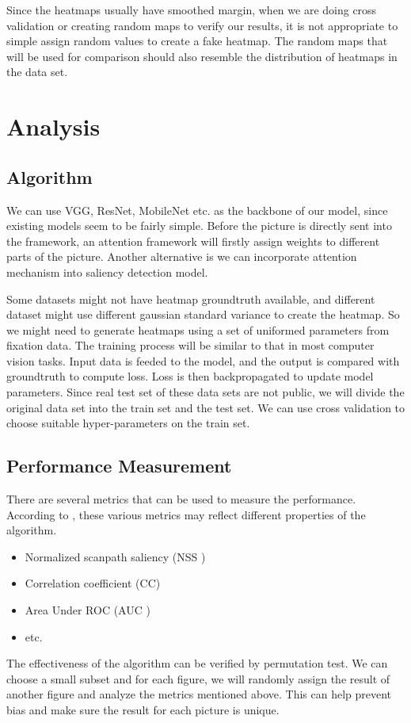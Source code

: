 \documentclass[12pt]{article}
\begin{document}
Since the heatmaps usually have smoothed margin, when we are doing cross validation or creating random maps to verify our results, it is not appropriate to simple assign random values to create a fake heatmap. 
The random maps that will be used for comparison should also resemble the distribution of heatmaps in the data set.

\section{Analysis}
\subsection{Algorithm}

We can use VGG, ResNet, MobileNet etc. as the backbone of our model, since existing models seem to be fairly simple. Before the picture is directly sent into the framework, an attention framework will firstly assign weights to different parts of the picture.
Another alternative is we can incorporate attention mechanism \cite{zhangSelfAttentionGenerativeAdversarial2019a} into saliency detection model.

Some datasets might not have heatmap groundtruth available, and different dataset might use different gaussian standard variance to create the heatmap.
So we might need to generate heatmaps using a set of uniformed parameters from fixation data.
The training process will be similar to that in most computer vision tasks. Input data is feeded to the model,
and the output is compared with groundtruth to compute loss. Loss is then backpropagated to update model parameters.
Since real test set of these data sets are not public, we will divide the original data set into the train set and the test set. We can use cross validation to choose suitable hyper-parameters on the train set.


\subsection{Performance Measurement}

There are several metrics that can be used to measure the performance. According to \cite{riche2013saliency}, these various metrics may reflect different properties of the algorithm.
\begin{itemize}
    \item Normalized scanpath saliency (NSS \cite{petersComponentsBottomupGaze2005})
    \item Correlation coefficient (CC)
    \item Area Under ROC (AUC \cite{richeSaliencyHumanFixations2013})
    \item etc.
\end{itemize}
The effectiveness of the algorithm can be verified by permutation test. We can choose a small subset and for each figure, we will randomly assign the result of another figure and analyze the metrics mentioned above. This can help prevent bias and make sure the result for each picture is unique.
\end{document}
